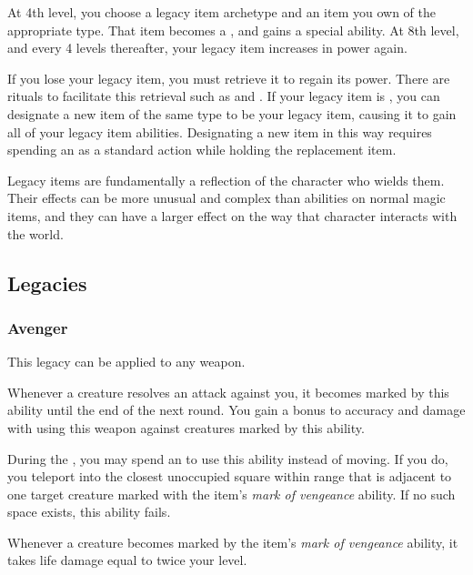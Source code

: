     At 4th level, you choose a legacy item archetype and an item you own of the appropriate type.
    That item becomes a , and gains a special ability.
    At 8th level, and every 4 levels thereafter, your legacy item increases in power again.

    If you lose your legacy item, you must retrieve it to regain its power.
    There are rituals to facilitate this retrieval such as  and .
    If your legacy item is , you can designate a new item of the same type to be your legacy item, causing it to gain all of your legacy item abilities.
    Designating a new item in this way requires spending an  as a standard action while holding the replacement item.

    Legacy items are fundamentally a reflection of the character who wields them.
    Their effects can be more unusual and complex than abilities on normal magic items, and they can have a larger effect on the way that character interacts with the world.

    \subsection{Legacies}\label{Legacies}

        \subsubsection{Avenger}

            This legacy can be applied to any weapon.

             Whenever a creature resolves an attack against you, it becomes marked by this ability until the end of the next round.
            You gain a  bonus to accuracy and damage with  using this weapon against creatures marked by this ability.

             During the , you may spend an  to use this ability instead of moving.
            If you do, you teleport into the closest unoccupied square within \rnglong range that is adjacent to one target creature marked with the item's \textit{mark of vengeance} ability.
            If no such space exists, this ability fails.

             Whenever a creature becomes marked by the item's \textit{mark of vengeance} ability, it takes life damage equal to twice your level.

